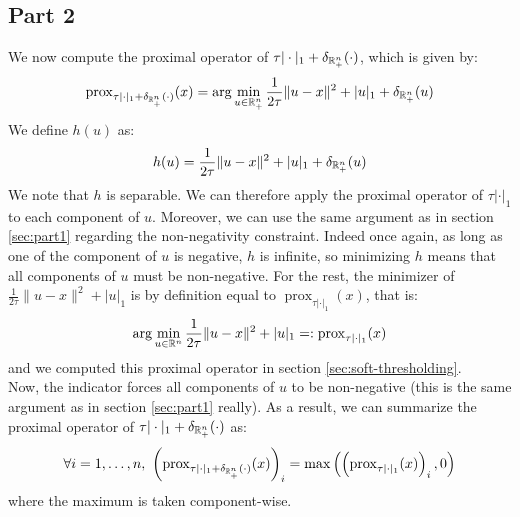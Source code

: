 \documentclass[12pt]{article}
\newcommand{\prox}{\operatorname{prox}}
\begin{document}
\subsection{Part 2}
We now compute the proximal operator of $\tau |\cdot|_1 + \delta_{\mathbb{R}_+^n} (\cdot)$, which is given by:
\begin{equation*}
  \prox_{\tau |\cdot|_1 + \delta_{\R_+^n} (\cdot)}(x) = \arg\min_{u \in \R_+^n} \frac{1}{2\tau}\|u-x\|^2 + |u|_1 + \delta_{\R_+^n} (u)
\end{equation*}
We define $h(u)$ as:
\begin{equation*}
  h(u) = \frac{1}{2\tau}\|u-x\|^2 + |u|_1 + \delta_{\mathbb{R}_+^n} (u)
\end{equation*}
We note that $h$ is separable. We can therefore apply the proximal operator of $\tau |\cdot|_1$ to each component of $u$. Moreover, we can use the same argument as in section \ref{sec:part1} regarding the non-negativity constraint. Indeed once again, as long as one of the component of $u$ is negative, $h$ is infinite, so minimizing $h$ means that all components of $u$ must be non-negative. For the rest, the minimizer of $\frac{1}{2\tau}\|u-x\|^2 + |u|_1$ is by definition equal to $\prox_{\tau |\cdot|_1}(x)$, that is:
\begin{equation*}
  \arg\min_{u \in \R^n} \frac{1}{2\tau}\|u-x\|^2 + |u|_1 =: \prox_{\tau |\cdot|_1}(x)
\end{equation*}
and we computed this proximal operator in section \ref{sec:soft-thresholding}. \\
Now, the indicator forces all components of $u$ to be non-negative (this is the same argument as in section \ref{sec:part1} really). As a result, we can summarize the proximal operator of $\tau |\cdot|_1 + \delta_{\mathbb{R}_+^n} (\cdot)$ as:
\begin{equation*}
  \forall i = 1, \ldots, n, \  \left(\prox_{\tau |\cdot|_1 + \delta_{\R_+^n} (\cdot)}(x)\right)_i = \max\left(\left(\prox_{\tau |\cdot|_1}(x)\right)_i, 0\right)
\end{equation*}
where the maximum is taken component-wise.
\end{document}
